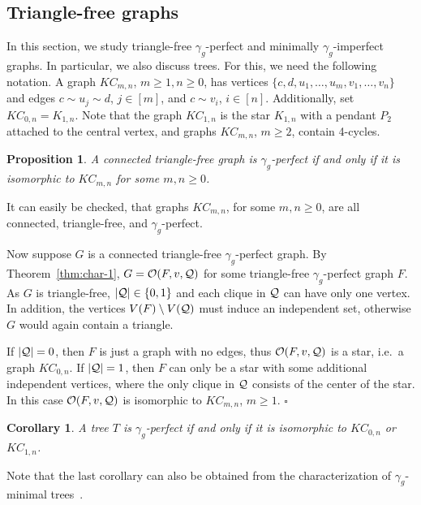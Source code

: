 \documentclass[12pt]{article}
\newtheorem{proposition}[theorem]{Proposition}
\newtheorem{corollary}[theorem]{Corollary}
\newcommand{\proof}{\noindent{\bf Proof.\ }}
\newcommand{\qed}{\hfill $\square$ \bigskip}
\newcommand{\cO}{{\cal O}}
\newcommand{\cQ}{{\cal Q}}
\begin{document}
\subsection{Triangle-free graphs}
\label{subsec:triangle-free}

In this section, we study triangle-free $\gamma_g$-perfect and minimally $\gamma_g$-imperfect graphs. In particular, we also discuss trees. For this, we need the following notation. A graph $KC_{m,n}$, $m \geq 1, n \geq 0$, has vertices $\{c, d, u_1, \ldots, u_m, v_1, \ldots, v_n \}$ and edges $c \sim u_j \sim d$, $j \in [m]$, and $c \sim v_i$, $i \in [n]$. Additionally, set $KC_{0, n} = K_{1,n}$. Note that the graph $KC_{1, n}$ is the star $K_{1,n}$ with a pendant $P_2$ attached to the central vertex, and graphs $KC_{m, n}$, $m \geq 2$, contain 4-cycles.

\begin{proposition}
	\label{prop:triangle-free-perfect}
	A connected triangle-free graph is $\gamma_g$-perfect if and only if it is isomorphic to $KC_{m,n}$ for some $m, n \geq 0$.
\end{proposition}

\proof
It can easily be checked, that graphs $KC_{m,n}$, for some $m, n \geq 0$, are all connected, triangle-free, and $\gamma_g$-perfect. 

Now suppose $G$ is a connected triangle-free $\gamma_g$-perfect graph. By Theorem~\ref{thm:char-1}, $G = \cO(F, v, \cQ)$ for some triangle-free $\gamma_g$-perfect graph $F$. As $G$ is triangle-free, $|\cQ| \in \{0, 1\}$ and each clique in $\cQ$ can have only one vertex. In addition, the vertices $V(F) \setminus V(\cQ)$ must induce an independent set, otherwise $G$ would again contain a triangle. 

If $|\cQ| = 0$, then $F$ is just a graph with no edges, thus $\cO(F, v, \cQ)$ is a star, i.e.\ a graph $KC_{0, n}$. If $|\cQ| = 1$, then $F$ can only be a star with some additional independent vertices, where the only clique in $\cQ$ consists of the center of the star. In this case $\cO(F, v, \cQ)$ is isomorphic to $KC_{m, n}$, $m \geq 1$.
\qed

\begin{corollary}
	\label{cor:trees-perfect}
	A tree $T$ is $\gamma_g$-perfect if and only if it is isomorphic to $KC_{0, n}$ or $KC_{1, n}$.
\end{corollary}

Note that the last corollary can also be obtained from the characterization of $\gamma_g$-minimal trees~\cite{nadjafi-2016}.
\end{document}
